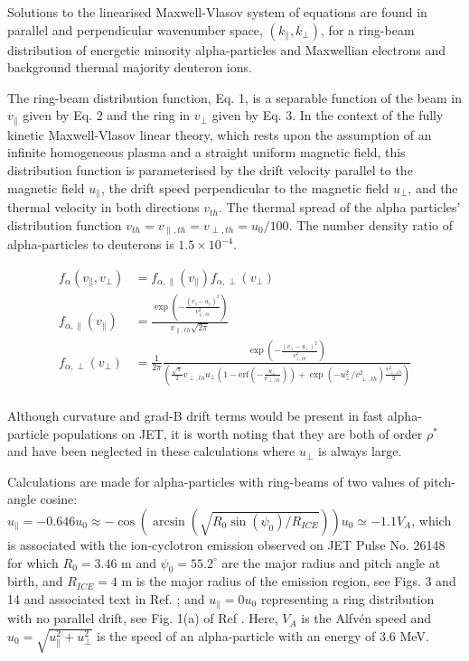 \documentclass[12pt]{iopart}
\begin{document}
Solutions to the linearised Maxwell-Vlasov system of equations are found in
parallel and perpendicular wavenumber space, $(k_\parallel, k_\bot)$, for a
ring-beam distribution of energetic minority
alpha-particles and Maxwellian electrons and background thermal majority
deuteron ions.

The ring-beam distribution function, Eq. 1, is a separable
function of the beam in $v_\parallel$ given by Eq. 2 and the
ring in $v_\perp$ given by Eq. 3.
In the context of the fully kinetic Maxwell-Vlasov linear theory,
which rests upon the assumption of
an infinite homogeneous plasma and a straight uniform magnetic field,
this distribution function is parameterised  by the drift
velocity parallel to the magnetic field $u_\parallel$, the drift speed 
perpendicular to the magnetic
field $u_{\perp}$, and the thermal velocity in both directions $v_{th}$. The
thermal spread of the alpha particles' distribution function 
$v_{th}=v_{\parallel,th}=v_{\perp,th}=u_0/100$. The number density
ratio of alpha-particles to deuterons is $1.5\times10^{-4}$.

\begin{align}
f_\alpha\left(v_\parallel, v_\perp\right) &=
  f_{\alpha,\parallel}\left(v_\parallel\right)f_{\alpha,\perp}\left(v_\perp\right)\\
f_{\alpha,\parallel}\left(v_\parallel\right) &=
  \frac{\exp\left(-\frac{(v_\parallel -
  u_\parallel)^2}{v_{\parallel,th}^2}\right)}{v_{\parallel,th} \sqrt{2
  \pi}}\\
f_{\alpha,\perp}\left(v_\perp\right) &=
  \frac{1}{2\pi}\frac{\exp\left(-\frac{\left(v_\bot -
  u_\bot\right)^2}{v_{\bot,th}^2}\right)}{\left(\frac{\sqrt \pi}{2} v_{\perp,
  th} u_\bot (1 - \mathrm{erf}(-\frac{u_\bot}{v_{\perp,th}})) + \exp(-u_\bot^2 /
  v_{\perp, th}^2) \frac{v_{\perp,th}^2}{2}\right)}\\
\end{align}

Although curvature and grad-B drift terms would be present in fast
alpha-particle populations on JET, it is worth noting that they are both of
order $\rho^*$ and have been neglected in these calculations where $u_\bot$ is
always large.

Calculations are made for alpha-particles with ring-beams of two
values of pitch-angle cosine: $u_\parallel=-0.646 u_0 \approx
-\cos(\arcsin(\sqrt{R_0 \sin(\psi_0)/R_{ICE}})) u_0 \simeq -1.1 V_A$, which is
associated with the ion-cyclotron emission observed on JET Pulse No. 26148 for
which $R_0=3.46$ m and
$\psi_0=55.2^\circ$ are the major radius and pitch angle at birth, and
$R_{ICE}=4$ m is the major radius of the emission region, see
Figs. 3 and 14 and associated text in Ref. \cite{Cottrell1993}; and
$u_\parallel=0 u_0$ representing a ring distribution with no parallel drift, see
Fig. 1(a) of Ref \cite{Cook2013}. Here, $V_A$ is the Alfv{\'en} speed and $u_0=\sqrt{u_\parallel^2 + u_\perp^2}$ is
the speed of an alpha-particle with an energy of 3.6 MeV.
\end{document}
